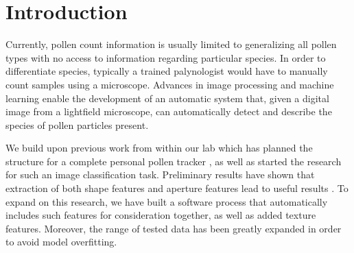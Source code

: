 \section{Introduction}

Currently, pollen count information is usually limited to generalizing all pollen types with no access to information regarding particular species. In order to differentiate species, typically a trained palynologist would have to manually count samples using a microscope. Advances in image processing and machine learning enable the development of an automatic system that, given a digital image from a lightfield microscope, can automatically detect and describe the species of pollen particles present.

We build upon previous work from within our lab which has planned the structure for a complete personal pollen tracker \cite{Lozano_2012}, as well as started the research for such an image classification task. Preliminary results have shown that extraction of both shape features and aperture features lead to useful results \cite{Lozano_2014}. To expand on this research, we have built a software process that automatically includes such features for consideration together, as well as added texture features. Moreover, the range of tested data has been greatly expanded in order to avoid model overfitting. 

  
  